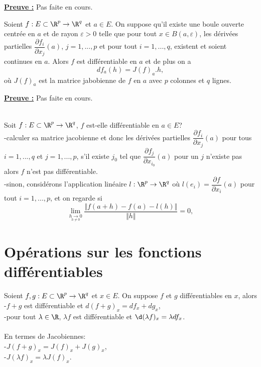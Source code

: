 \documentclass[class=report,crop=false]{standalone}
\begin{document}
\noindent \underline{\bf Preuve :}
Pas faite en cours.

 \begin{proposition}[GENERALISATION]
\textcolor[rgb]{0.50,0.00,0.25}{
Soient $f: E \subset \R^p \rightarrow \R^q$ et $a \in E$. On suppose qu'il existe une
boule ouverte centrée en $a$ et de rayon $\varepsilon >0$ telle que pour tout $x \in B(a,\varepsilon)$, les dérivées partielles $\dfrac{\partial f_i}{\partial x_j }(a)$, $j=1,...,p$ et pour
tout $i=1,...,q$, 
existent et soient continues en $a$. Alors $f$ est différentiable en $a$ et de plus on a 
\begin{equation*}
df_a(h)=J(f)_a . h, 
\end{equation*}
où $J(f)_a$ est la matrice jabobienne de $f$ en $a$ avec $p$ colonnes et $q$ lignes.
}
\end{proposition}

\noindent \underline{\bf Preuve :}
Pas faite en cours.

  \begin{remarque*}
\textcolor[rgb]{0.00,0.00,1.00}{ \\
Soit $f: E \subset \R^p \rightarrow \R^q$, $f$ est-elle différentiable en $a \in E$?\\
-calculer sa matrice jacobienne et donc les dérivées partielles  $\dfrac{\partial f_i}{\partial x_j }(a)$ pour tous $i=1,..., q$ et $j=1,...,p$,
s'il existe $j_0$ tel que $\dfrac{\partial f_j}{\partial x_{i_0} }(a)$ pour un $j$ n'existe pas alors $f$ n'est pas 
différentiable.\\
-sinon, considérons l'application linéaire $l: \R^p \rightarrow \R^q$ où $l(e_i)=\dfrac{\partial f}{\partial x_i }(a)$ pour tout $i=1,...,p$, et on regarde si
\begin{equation*}
\displaystyle \lim_{\underset{h \neq 0}{h\rightarrow 0}}  \dfrac{\Vert f(a+h)-f(a)-l(h)\Vert}{\Vert h \Vert}=0,
\end{equation*}
}
\end{remarque*}

\section{Opérations sur les fonctions différentiables}

 \begin{proposition}[LINEARITE]
\textcolor[rgb]{0.50,0.00,0.25}{
Soient $f,g: E \subset \R^p \rightarrow \R^q$ et $x \in E$. On suppose  $f$ et $g$
différentiables en $x$, alors\\
-$f+g$ est différentiable et $d(f+g)_x=df_x+dg_x$,\\
-pour tout $\lambda \in \R$, $\lambda f$ est différentiable et $\d(\lambda f)_x=\lambda df_x$.\\
 \\
En termes de Jacobiennes:\\
-$J(f+g)_x=J(f)_x+J(g)_x$,\\
-$J(\lambda f)_x= \lambda J(f)_x$.
}
\end{proposition}
\end{document}
